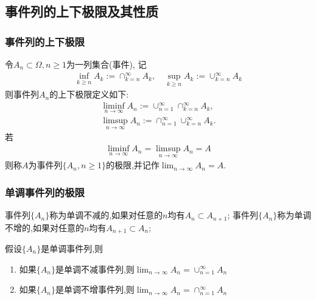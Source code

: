 \subsection{事件列的上下极限及其性质}

\begin{frame}
	\frametitle{事件列的上下极限}
	\begin{defi}
		令$A_n\subset \Omega, n\geq 1$为一列集合(事件), 记
		\begin{eqnarray*}
			\inf_{k\geq n} A_k:=\cap_{k=n}^\infty A_k,\quad  \sup_{k\geq n}A_k:=\cup_{k=n}^\infty A_k
		\end{eqnarray*}
		则事件列$A_n$的上下极限定义如下:
		\begin{eqnarray*}
			\liminf_{n\rightarrow\infty}A_n:=\cup_{n=1}^\infty\cap_{k=n}^\infty A_k,\\%
			\limsup_{n\rightarrow\infty}A_n:=\cap_{n=1}^\infty\cup_{k=n}^\infty A_k.
		\end{eqnarray*}
		若
		\begin{eqnarray*}
			\liminf_{n\rightarrow\infty}A_n=\limsup_{n\rightarrow\infty}A_n=A
		\end{eqnarray*}
		则称$A$为事件列$\{A_n,n\geq 1\}$的极限,并记作$\lim_{n\rightarrow\infty}A_n=A$.
	\end{defi}

\end{frame}


\begin{frame}
	\frametitle{单调事件列的极限}
	\begin{defi}
		事件列$\{A_n\}$称为单调不减的,如果对任意的$n$均有$A_n\subset A_{n+1}$;     事件列$\{A_n\}$称为单调不增的,如果对任意的$n$均有$A_{n+1}\subset A_n$;
	\end{defi}
	\vspace{0.4cm}

	\pause


	\begin{thm}
		假设$\{A_n\}$是单调事件列,则
		\begin{enumerate}
			\item 如果$\{A_n\}$是单调不减事件列,则$\lim_{n\rightarrow\infty}A_n=\cup_{n=1}^\infty A_n$
			\item 如果$\{A_n\}$是单调不增事件列,则$\lim_{n\rightarrow\infty}A_n=\cap_{n=1}^\infty A_n$
		\end{enumerate}

	\end{thm}

\end{frame}


